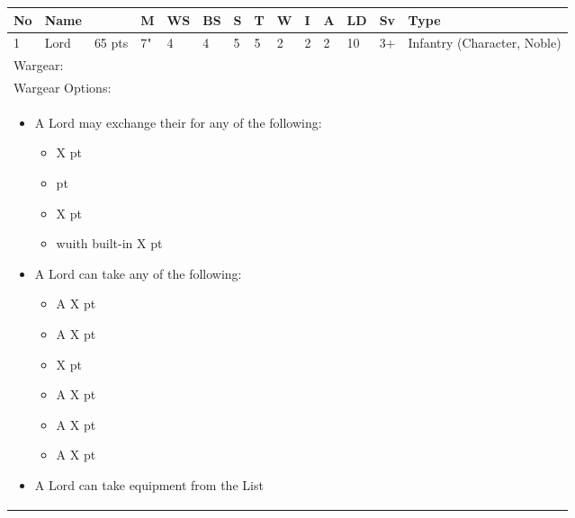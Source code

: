 


\noindent
\begin{tabular}{||m{10pt} m{95pt} m{30pt} m{11pt} m{11pt} m{11pt} m{11pt} m{11pt} m{11pt} m{11pt} m{11pt} m{11pt} m{11pt} m{125pt}||}
	\hline
	No & Name & & M & WS & BS & S & T & W & I & A & LD & Sv & Type \\
	\hline
	1 & Lord & 65 pts & 7" & 4 & 4 & 5 & 5 & 2 & 2 & 2 & 10 & 3+ &Infantry (Character, Noble)\\
	\hline
	\hline
	\multicolumn{14}{||Z{532 pt}||}{Wargear: \quickref{Staff of Light}}\\
	\multicolumn{14}{||Z{532 pt}||}{Wargear Options:} \\	\multicolumn{14}{||Z{532 pt}||}{\begin{itemize}
			\item A Lord may exchange their \quickref{Staff of Light} for any of the following:
			\begin{itemize}
				\item \quickref{Hyperphase Sword} \hrulefill X pt
				\item \quickref{Voidblade} \hrulefill 0 pt
				\item \quickref{Warscythe} \hrulefill X pt
				\item \quickref{Warscythe} wuith built-in \quickref{Relic Gauss Blaster} \hrulefill X pt
			\end{itemize}
			\item A Lord can take any of the following:
			\begin{itemize}
				\item A \quickref{Gauntlet of Fire} \hrulefill X pt
				\item A \quickref{Tachyon Arrow} \hrulefill X pt
				\item \quickref{Mindshackle Scarabs} \hrulefill X pt
				\item A \quickref{Phase Shifter} \hrulefill X pt
				\item A \quickref{Phylactery} \hrulefill X pt
				\item A \quickref{Resurrection Orb} \hrulefill X pt
			\end{itemize}
			\item A Lord can take equipment from the \quickref{Artefacts of the Aeons} List
	\end{itemize}} \\	
\end{tabular}

